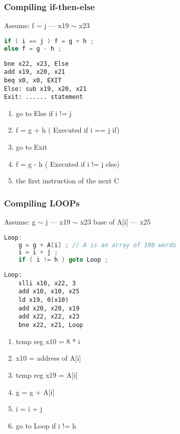 \subsubsection{Compiling if-then-else}
Assume: f $\sim$ j --- x19 $\sim$ x23
\begin{lstlisting}[language={c},title={C code}]
if ( i == j ) f = g + h ;
else f = g - h ;
\end{lstlisting}

\begin{lstlisting}[language={[x86masm]Assembler},title={RISC-V assembly code}]
bne x22, x23, Else
add x19, x20, x21
beq x0, x0, EXIT
Else: sub x19, x20, x21
Exit: ...... statement
\end{lstlisting}
\begin{enumerate}
    \item go to Else if i != j
    \item f = g + h ( Executed if i == j if)
    \item go to Exit
    \item f = g - h ( Executed if i != j else)
    \item the first instruction of the next C
\end{enumerate}

\subsubsection{Compiling LOOPs}
Assume: g $\sim$ j --- x19 $\sim$ x23 base of A[i] --- x25
\begin{lstlisting}[language={c},title={C code}]
Loop: 
    g = g + A[i] ; // A is an array of 100 words
    i = i + j ;
    if ( i != h ) goto Loop ;
\end{lstlisting}

\begin{lstlisting}[language={[x86masm]Assembler},title={RISC-V assembly code}]
Loop: 
    slli x10, x22, 3
    add x10, x10, x25 
    ld x19, 0(x10)
    add x20, x20, x19 
    add x22, x22, x23 
    bne x22, x21, Loop
\end{lstlisting}
\begin{enumerate}
    \item  temp reg x10 = 8 * i
    \item x10 = address of A[i]
    \item temp reg x19 = A[i]
    \item g = g + A[i]
    \item i = i + j
    \item go to Loop if i != h
\end{enumerate}

